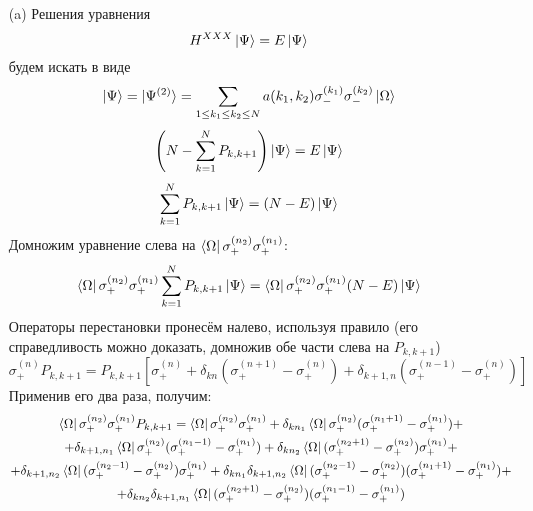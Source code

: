 \documentclass[12pt]{article}
\begin{document}
\begin{enumerate}
\begin{itemize}
        \item[(a)] Решения уравнения
        \begin{equation}
            H^{XXX}\ket{\Psi}=E\ket{\Psi}
        \end{equation}
        будем искать в виде
        \begin{equation}
            \ket{\Psi}=\ket{\Psi^{(2)}}=\sum\limits_{1\leq k_1\leq k_2\leq N}a(k_1,k_2)\sigma_-^{(k_1)}\sigma_-^{(k_2)}\ket{\Omega}
        \end{equation}
        \begin{equation}
            \left(N-\sum\limits_{k=1}^NP_{k,k+1}\right)\ket{\Psi}=E\ket{\Psi}
        \end{equation}
        \begin{equation}
            \sum\limits_{k=1}^NP_{k,k+1}\ket{\Psi}=(N-E)\ket{\Psi}
        \end{equation}
        Домножим уравнение слева на $\bra{\Omega}\sigma_+^{(n_2)}\sigma_+^{(n_1)}$:
        \begin{equation}
            \bra{\Omega}\sigma_+^{(n_2)}\sigma_+^{(n_1)}\sum\limits_{k=1}^NP_{k,k+1}\ket{\Psi}=\bra{\Omega}\sigma_+^{(n_2)}\sigma_+^{(n_1)}(N-E)\ket{\Psi}
        \end{equation}
        Операторы перестановки пронесём налево, используя правило (его справедливость можно доказать, домножив обе части слева на $P_{k,k+1}$)
        \begin{equation}
            \sigma_+^{(n)}P_{k,k+1}=P_{k,k+1}[\sigma_+^{(n)}+\delta_{kn}(\sigma_+^{(n+1)}-\sigma_+^{(n)})+\delta_{k+1,n}(\sigma_+^{(n-1)}-\sigma_+^{(n)})]
        \end{equation}
        Применив его два раза, получим:
        \begin{multline}
            \bra{\Omega}\sigma_+^{(n_2)}\sigma_+^{(n_1)}P_{k,k+1}= \bra{\Omega}\sigma_+^{(n_2)}\sigma_+^{(n_1)}+\delta_{kn_1}\bra{\Omega}\sigma_+^{(n_2)}(\sigma_+^{(n_1+1)}-\sigma_+^{(n_1)})+\\
            +\delta_{k+1,n_1}\bra{\Omega}\sigma_+^{(n_2)}(\sigma_+^{(n_1-1)}-\sigma_+^{(n_1)})+\delta_{kn_2}\bra{\Omega}(\sigma_+^{(n_2+1)}-\sigma_+^{(n_2)})\sigma_+^{(n_1)}+\\
            +\delta_{k+1,n_2}\bra{\Omega}(\sigma_+^{(n_2-1)}-\sigma_+^{(n_2)})\sigma_+^{(n_1)}+\delta_{kn_1}\delta_{k+1,n_2}\bra{\Omega}(\sigma_+^{(n_2-1)}-\sigma_+^{(n_2)})(\sigma_+^{(n_1+1)}-\sigma_+^{(n_1)})+\\
            +\delta_{kn_2}\delta_{k+1,n_1}\bra{\Omega}(\sigma_+^{(n_2+1)}-\sigma_+^{(n_2)})(\sigma_+^{(n_1-1)}-\sigma_+^{(n_1)})

\end{multline}
\end{itemize}
\end{enumerate}
\end{document}
